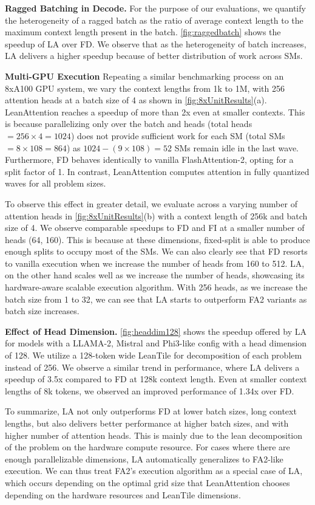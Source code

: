 {{{{{\textbf{Ragged Batching in Decode.}} For the purpose of our evaluations, we quantify the heterogeneity of a ragged batch as the ratio of average context length to the maximum context length present in the batch. \autoref{fig:raggedbatch} shows the speedup of LA over FD. We observe that as the heterogeneity of batch increases, LA delivers a higher speedup because of better distribution of work across SMs.

{\textbf{Multi-GPU Execution}} Repeating a similar benchmarking process on an 8xA100 GPU system, we vary the context lengths from 1k to 1M, with 256 attention heads at a batch size of 4 as shown in \autoref{fig:8xUnitResults}(a). LeanAttention reaches a speedup of more than 2x even at smaller contexts. This is because parallelizing only over the batch and heads (total heads $= 256 \times 4 = 1024$) does not provide sufficient work for each SM (total SMs $= 8 \times 108 = 864$) as  $1024 - (9 \times 108) = 52$ SMs remain idle in the last wave. Furthermore, FD behaves identically to vanilla FlashAttention-2, opting for a split factor of 1. In contrast, LeanAttention computes attention in fully quantized waves for all problem sizes.

To observe this effect in greater detail, we evaluate across a varying number of attention heads in \autoref{fig:8xUnitResults}(b) with a context length of 256k and batch size of 4. We observe comparable speedups to FD and FI at a smaller number of heads (64, 160). This is because at these dimensions, fixed-split is able to produce enough splits to occupy most of the SMs. We can also clearly see that FD resorts to vanilla execution when we increase the number of heads from 160 to 512. LA, on the other hand scales well as we increase the number of heads, showcasing its hardware-aware scalable execution algorithm. With 256 heads, as we increase the batch size from 1 to 32, we can see that LA starts to outperform FA2 variants as batch size increases.

{\textbf{Effect of Head Dimension.}} \autoref{fig:headdim128} shows the speedup offered by LA for models with a LLAMA-2, Mistral and Phi3-like config with a head dimension of 128. We utilize a 128-token wide LeanTile for decomposition of each problem instead of 256.  We observe a similar trend in performance, where LA delivers a speedup of 3.5x compared to FD at 128k context length. Even at smaller context lengths of 8k tokens, we observed an improved performance of 1.34x over FD.

To summarize, LA not only outperforms FD at lower batch sizes, long context lengths, but also delivers better performance at higher batch sizes, and with higher number of attention heads. This is mainly due to the lean decomposition of the problem on the hardware compute resource. For cases where there are enough parallelizable dimensions, LA automatically generalizes to FA2-like execution. We can thus treat FA2's execution algorithm as a special case of LA, which occurs depending on the optimal grid size that LeanAttention chooses depending on the hardware resources and LeanTile dimensions. 

}}}}
